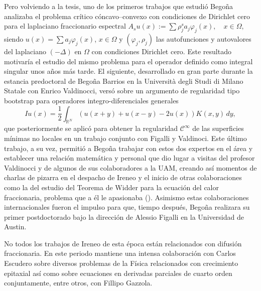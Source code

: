 Pero volviendo a la tesis, uno de los primeros trabajos que estudi\'o Bego\~na  analizaba el problema cr\'itico 
c\'oncavo--convexo con condiciones de Dirichlet cero para el laplaciano fraccionario espectral $A_{s}u(x):=\sum
  \rho_j^{s}a_j\varphi_j(x),\quad x\in \Omega,$
siendo $u(x)=\sum a_j\varphi_j(x)$, $x\in\Omega$ y $(\varphi_j,\rho_j)$ las autofunciones y autovalores del laplaciano $(-\Delta)$ en $\Omega$ con condiciones Dirichlet cero. Este resultado  motivar\'ia el estudio del mismo problema para el operador definido como integral singular unos a\~nos m\'as tarde. El siguiente, desarrollado en gran parte durante la estancia predoctoral de Bego\~na Barrios en la Universit\`a degli Studi di Milano Statale  con Enrico Valdinocci, vers\'o sobre un argumento de regularidad tipo bootstrap para operadores integro-diferenciales generales 
$$Iu(x)= \frac{1}{2}\int_{\mathbb R^N} (u(x+y) + u(x-y) - 2u(x)) K(x,y)\, dy,$$
que posteriormente se aplic\'o para obtener la regularidad $\mathcal{C}^{\infty}$ de las superficies m\'inimas no locales en un trabajo conjunto con Figalli y Valdinoci. Este \'ultimo trabajo, a su vez, permiti\'o a Bego\~na trabajar con estos dos expertos en el \'area y establecer una relaci\'on matem\'atica y personal que dio lugar a visitas del profesor {Valdinocci} y de algunos de sus colaboradores a la UAM, creando as\'i momentos de charlas de pizarra en el despacho de Ireneo y el inicio de otras colaboraciones como la del estudio del Teorema de Widder para la ecuaci\'on del calor fraccionaria, problema que a \'el  le apasionaba {(\cite{BPSV})}. Asimismo estas colaboraciones internacionales fueron el impulso para que, tiempo despu\'es, Bego\~na realizara su primer postdoctorado bajo la direcci\'on de Alessio Figalli en la Universidad de Austin. 

No todos los trabajos de Ireneo de esta \'epoca est\'an relacionados con  difusi\'on fraccionaria. En este periodo mantiene una intensa colaboraci\'on con Carlos Escudero sobre diversos problemas de la F\'isica relacionados con crecimiento epitaxial as\'i como sobre ecuaciones en derivadas parciales de cuarto orden conjuntamente, entre otros, con  Fillipo Gazzola.
	

